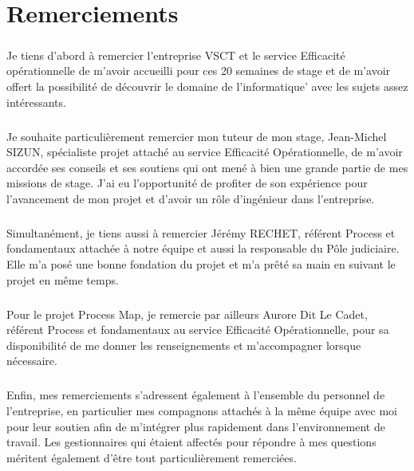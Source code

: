 \chapter*{Remerciements}

\paragraph{} Je tiens d’abord à remercier l’entreprise VSCT et le service Efficacité opérationnelle de
m’avoir accueilli pour ces 20 semaines de stage et de m’avoir offert la possibilité de découvrir le
domaine de l'informatique' avec les sujets assez intéressants.
\paragraph{} Je souhaite particulièrement remercier mon tuteur de mon stage, Jean-Michel SIZUN, spécialiste projet
attaché au service Efficacité Opérationnelle, de m’avoir accordée ses conseils et ses soutiens qui
ont mené à bien une grande partie de mes missions de stage. J’ai eu l’opportunité de profiter de
son expérience pour l’avancement de mon projet et d'avoir un rôle d’ingénieur dans l’entreprise.
\paragraph{} Simultanément, je tiens aussi à remercier Jérémy RECHET, référent Process et fondamentaux
attachée à notre équipe et aussi la responsable du Pôle judiciaire. Elle m’a posé une bonne
fondation du projet et m’a prêté sa main en suivant le projet en même temps.
\paragraph{} Pour le projet Process Map, je remercie par ailleurs Aurore Dit Le Cadet, référent Process et
fondamentaux au service Efficacité Opérationnelle, pour sa disponibilité de me donner les
renseignements et m’accompagner lorsque nécessaire.
\paragraph{} Enfin, mes remerciements s’adressent également à l’ensemble du personnel de l’entreprise, en
particulier mes compagnons attachés à la même équipe avec moi pour leur soutien afin de
m’intégrer plus rapidement dans l’environnement de travail. Les gestionnaires qui étaient affectés
pour répondre à mes questions méritent également d’être tout particulièrement remerciées.
